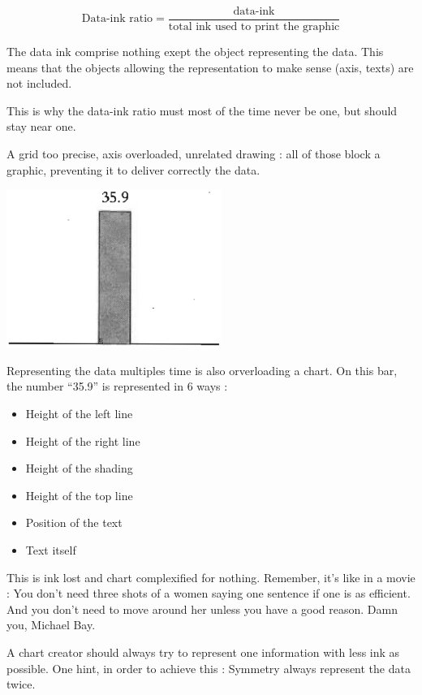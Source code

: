 $$\text{Data-ink ratio} = \frac{\text{data-ink}}{\text{total ink used to print the graphic}}$$

The data ink comprise nothing exept the object representing the data. This means that the objects allowing the representation to make sense (axis, texts) are not included. 

This is why the data-ink ratio must most of the time never be one, but should stay near one.

A grid too precise, axis overloaded, unrelated drawing : all of those block a graphic, preventing it to deliver correctly the data.

\centerline{
\includegraphics[width=07cm]{./illustrations/annexes/histogramme.eps}
}

Representing the data multiples time is also orverloading a chart. On this bar, the number ``35.9'' is represented in 6 ways :
\begin{itemize}
\item Height of the left line
\item Height of the right line
\item Height of the shading
\item Height of the top line
\item Position of the text
\item Text itself
\end{itemize}

This is ink lost and chart complexified for nothing. Remember, it's like in a movie : You don't need three shots of a women saying one sentence if one is as efficient. 
 And you don't need to move around her unless you have a good reason. 
 Damn you, Michael Bay.

 A chart creator should always try to represent one information with less ink as possible.
 One hint, in order to achieve this : Symmetry always represent the data twice.

